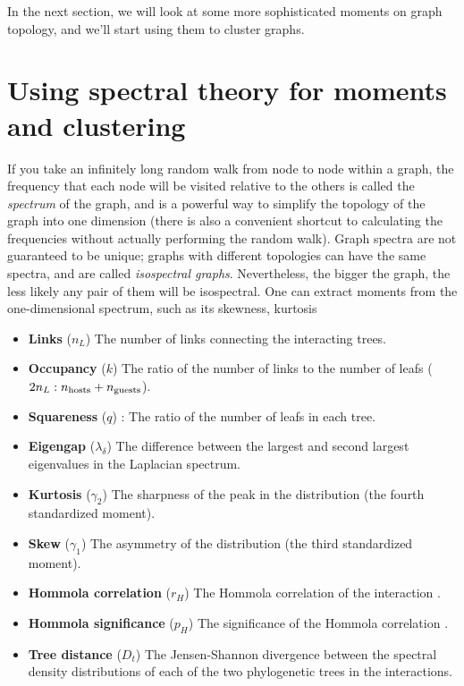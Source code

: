 \documentclass[
10pt, %
a4paper, %
oneside, %
headinclude,footinclude, %
BCOR5mm, %
]{scrartcl}
\begin{document}




In the next section, we will look at some more sophisticated moments on graph topology, and we'll start using them to cluster graphs.

\section{Using spectral theory for moments and clustering}


If you take an infinitely long random walk from node to node within a graph, the frequency that each node will be visited relative to the others is called the {\em spectrum} of the graph, and is a powerful way to simplify the topology of the graph into one dimension (there is also a convenient shortcut to calculating the frequencies without actually performing the random walk). Graph spectra are not guaranteed to be unique; graphs with different topologies can have the same spectra, and are called {\em isospectral graphs}. Nevertheless, the bigger the graph, the less likely any pair of them will be isospectral. One can extract moments from the one-dimensional spectrum, such as its skewness, kurtosis 

\begin{itemize}
    \item{\textbf{Links} ($n_{L}$)} The number of links connecting the interacting trees.

    \item{\textbf{Occupancy} ($k$)} The ratio of the number of links to the number of leafs ($2 n_{L} : n_{\rm hosts} + n_{\rm guests}$).

    \item{\textbf{Squareness} ($q$)} : The ratio of the number of leafs in each tree.

    \item{\textbf{Eigengap} ($\lambda_{\delta}$)} The difference between the largest and second largest eigenvalues in the Laplacian spectrum.
    
    \item{\textbf{Kurtosis} ($\gamma_{2}$)} The sharpness of the peak in the distribution (the fourth standardized moment).

    \item{\textbf{Skew} ($\gamma_{1}$)} The asymmetry of the distribution (the third standardized moment).

    \item{\textbf{Hommola correlation} ($r_{H}$)} The Hommola correlation of the interaction \cite{hommola2009permutation}.

    \item{\textbf{Hommola significance} ($p_{H}$)} The significance of the Hommola correlation \cite{hommola2009permutation}.

    \item{\textbf{Tree distance} ($D_{t}$)} The Jensen-Shannon divergence between the spectral density distributions of each of the two phylogenetic trees in the interactions.
\end{itemize}
\end{document}
